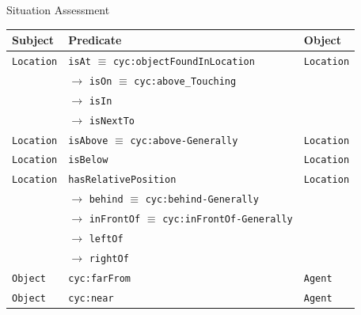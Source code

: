 \documentclass[xcolor=table]{beamer}
\newcommand{\concept}[1]{{\scriptsize \texttt{#1}}}
\begin{document}
{
\begin{frame}{Situation Assessment}
        \centering
        \\


\end{frame}
}


{
\begin{frame}{}
        \centering
        \scriptsize

        \begin{tabular}{p{1.5cm}lp{2cm}}
            Subject & Predicate  & Object  \\ 
            \hline
            \concept{Location} & \concept{isAt} $\equiv$ \concept{cyc:objectFoundInLocation}  &  \concept{Location}  \\ 
                               &  $\rightarrow$ \concept{isOn} $\equiv$ \concept{cyc:above\_Touching}  &   \\ 
                               &  $\rightarrow$ \concept{isIn}  &   \\ 
                               &  $\rightarrow$ \concept{isNextTo}  &   \\ 

            \concept{Location}  & \concept{isAbove} $\equiv$ \concept{cyc:above-Generally}  &  \concept{Location} \\ 
            \concept{Location}  & \concept{isBelow}  & \concept{Location} \\
            \hline
            \concept{Location}  & \concept{hasRelativePosition}  & \concept{Location}  \\ 
                                   & 	$\rightarrow$ \concept{behind} $\equiv$ \concept{cyc:behind-Generally}  & \\ 
                                      &  $\rightarrow$ \concept{inFrontOf} $\equiv$ \concept{cyc:inFrontOf-Generally}  & \\ 
                                         &  $\rightarrow$ \concept{leftOf}  &  \\ 
                                            &  $\rightarrow$ \concept{rightOf}  & 	 \\ 
            \concept{Object}  & \concept{cyc:farFrom}  &  \concept{Agent} \\ 
            \concept{Object}  & \concept{cyc:near}  &  \concept{Agent} \\


\end{tabular}
\end{frame}}
\end{document}
